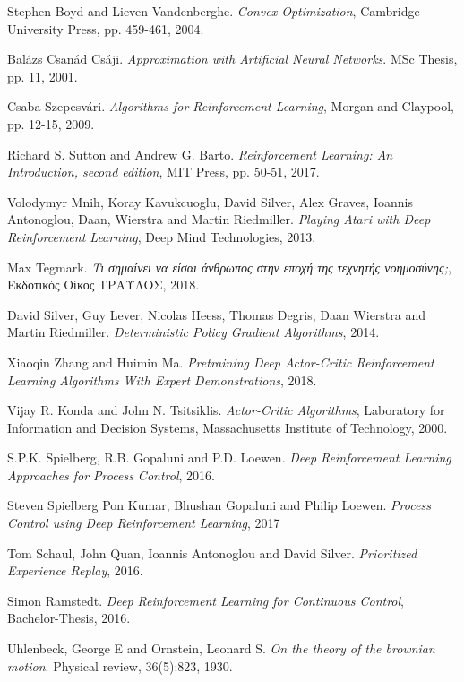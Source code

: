 \documentclass[11pt]{article} %
\numberwithin{equation}{subsection}
\begin{document}
\begin{thebibliography}{9}
Stephen Boyd and Lieven Vandenberghe. \textit{Convex Optimization}, Cambridge University Press, pp. 459-461, 2004.

Bal\'{a}zs Csan\'{a}d Cs\'{a}ji. \textit{Approximation with Artificial Neural Networks}. MSc Thesis, pp. 11, 2001.

Csaba Szepesv\'{a}ri. \textit{Algorithms for Reinforcement Learning}, Morgan and Claypool, pp. 12-15, 2009.

Richard S. Sutton and Andrew G. Barto. \textit{Reinforcement Learning: An Introduction, second edition}, MIT Press, pp. 50-51, 2017.

Volodymyr Mnih, Koray Kavukcuoglu, David Silver, Alex Graves, Ioannis Antonoglou, Daan, Wierstra and Martin Riedmiller. \textit{Playing Atari with Deep Reinforcement Learning}, Deep Mind Technologies, 2013.

Max Tegmark. \textit{Τι σημαίνει να είσαι άνθρωπος στην εποχή της τεχνητής νοημοσύνης;}, Εκδοτικός Οίκος ΤΡΑΥΛΟΣ, 2018.

David Silver, Guy Lever, Nicolas Heess, Thomas Degris, Daan Wierstra and Martin Riedmiller. \textit{Deterministic Policy Gradient Algorithms}, 2014.

Xiaoqin Zhang and Huimin Ma. \textit{Pretraining Deep Actor-Critic Reinforcement Learning Algorithms With Expert Demonstrations}, 2018.

Vijay R. Konda and John N. Tsitsiklis. \textit{Actor-Critic Algorithms}, Laboratory for Information and Decision Systems, Massachusetts Institute of Technology, 2000.

S.P.K. Spielberg, R.B. Gopaluni and P.D. Loewen. \textit{Deep Reinforcement Learning Approaches for Process Control}, 2016.

Steven Spielberg Pon Kumar, Bhushan Gopaluni and Philip Loewen. \textit{Process Control using Deep Reinforcement Learning}, 2017

Tom Schaul, John Quan, Ioannis Antonoglou and David Silver. \textit{Prioritized Experience Replay}, 2016.

Simon Ramstedt. \textit{Deep Reinforcement Learning for Continuous Control}, Bachelor-Thesis, 2016.

Uhlenbeck, George E and Ornstein, Leonard S. \textit{On the theory of the brownian motion}. Physical review, 36(5):823, 1930.


\end{thebibliography}
\end{document}
